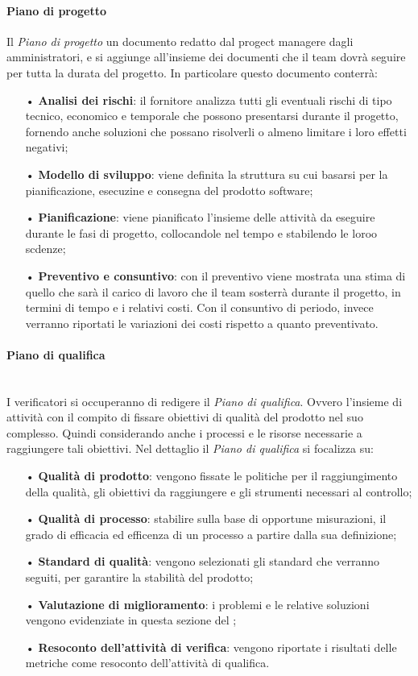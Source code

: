 			\paragraph{Piano di progetto}
			Il \textit{Piano di progetto} un documento redatto dal progect manager\glo e dagli amministratori, e si aggiunge all'insieme dei documenti che il team dovrà seguire per tutta la durata del progetto. In particolare questo documento conterrà:
			\begin{itemize}
				\item[•] \textbf{Analisi dei rischi}: il fornitore analizza tutti gli eventuali rischi di tipo tecnico, economico e temporale che possono presentarsi durante il progetto, fornendo anche soluzioni che possano risolverli o almeno limitare i loro effetti negativi;
				\item[•] \textbf{Modello di sviluppo}\glo: viene definita la struttura su cui basarsi per la pianificazione, esecuzine e consegna del prodotto software;
				\item[•] \textbf{Pianificazione}: viene pianificato l'insieme delle attività da eseguire durante le fasi di progetto, collocandole nel tempo e stabilendo le loroo scdenze;
				\item[•] \textbf{Preventivo e consuntivo}: con il preventivo viene mostrata una stima di quello che sarà il carico di lavoro che il team sosterrà durante il progetto, in termini di tempo e i relativi costi. Con il consuntivo di periodo, invece verranno riportati le variazioni dei costi rispetto a quanto preventivato.
			\end{itemize}

			\paragraph{Piano di qualifica} \\
			I verificatori si occuperanno di redigere il \textit{Piano di qualifica}. Ovvero l'insieme di attività con il compito di fissare obiettivi di qualità del prodotto nel suo complesso. Quindi considerando anche i processi e le risorse necessarie a raggiungere tali obiettivi. Nel dettaglio il \textit{Piano di qualifica} si focalizza su:
			\begin{itemize}
				\item[•] \textbf{Qualità di prodotto}: vengono fissate le politiche per il raggiungimento della qualità, gli obiettivi da raggiungere e gli strumenti necessari al controllo;
				\item[•] \textbf{Qualità di processo}: stabilire sulla base di opportune misurazioni, il grado di efficacia ed efficenza di un processo a partire dalla sua definizione;
				\item[•] \textbf{Standard di qualità}: vengono selezionati gli standard che verranno seguiti, per garantire la stabilità del prodotto;
				\item[•] \textbf{Valutazione di miglioramento}: i problemi e le relative soluzioni vengono evidenziate in questa sezione del ;
				\item[•] \textbf{Resoconto dell'attività di verifica}: vengono riportate i risultati delle metriche come resoconto dell'attività di qualifica.
			\end{itemize}
